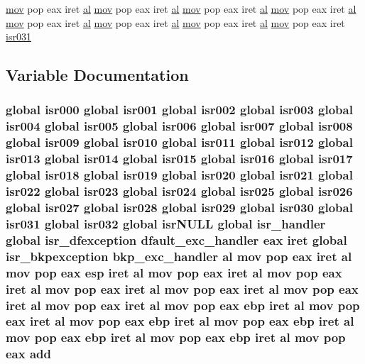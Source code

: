 \begin{DoxyCompactItemize}
\hyperlink{idt_8as_a3ca38a9ff3527e8845b56e9de4e66b0d}{mov} pop eax iret \hyperlink{isrs_8as_a55801884e6527c2d735351b4d6b66caf}{al} \hyperlink{idt_8as_a3ca38a9ff3527e8845b56e9de4e66b0d}{mov} pop eax iret \hyperlink{isrs_8as_a55801884e6527c2d735351b4d6b66caf}{al} \hyperlink{idt_8as_a3ca38a9ff3527e8845b56e9de4e66b0d}{mov} pop eax iret \hyperlink{isrs_8as_a55801884e6527c2d735351b4d6b66caf}{al} \hyperlink{idt_8as_a3ca38a9ff3527e8845b56e9de4e66b0d}{mov} pop eax iret \hyperlink{isrs_8as_a55801884e6527c2d735351b4d6b66caf}{al} \hyperlink{idt_8as_a3ca38a9ff3527e8845b56e9de4e66b0d}{mov} pop eax iret \hyperlink{isrs_8as_a55801884e6527c2d735351b4d6b66caf}{al} \hyperlink{idt_8as_a3ca38a9ff3527e8845b56e9de4e66b0d}{mov} pop eax iret \hyperlink{isrs_8as_a55801884e6527c2d735351b4d6b66caf}{al} \hyperlink{idt_8as_a3ca38a9ff3527e8845b56e9de4e66b0d}{mov} pop eax iret \hyperlink{isrs_8as_a55801884e6527c2d735351b4d6b66caf}{al} \hyperlink{idt_8as_a3ca38a9ff3527e8845b56e9de4e66b0d}{mov} pop eax iret \hyperlink{isrs_8as_aed11457273330a6f18970eca9c08d922}{isr031}
\end{DoxyCompactItemize}


\subsection{Variable Documentation}
\subsubsection[{\texorpdfstring{add}{add}}]{\setlength{\rightskip}{0pt plus 5cm}global {\bf isr000} global {\bf isr001} global {\bf isr002} global {\bf isr003} global {\bf isr004} global {\bf isr005} global {\bf isr006} global {\bf isr007} global {\bf isr008} global {\bf isr009} global {\bf isr010} global {\bf isr011} global {\bf isr012} global {\bf isr013} global {\bf isr014} global {\bf isr015} global {\bf isr016} global {\bf isr017} global {\bf isr018} global {\bf isr019} global {\bf isr020} global {\bf isr021} global {\bf isr022} global {\bf isr023} global {\bf isr024} global {\bf isr025} global {\bf isr026} global {\bf isr027} global {\bf isr028} global {\bf isr029} global {\bf isr030} global {\bf isr031} global isr032 global isr\+N\+U\+LL global isr\+\_\+handler global {\bf isr\+\_\+dfexception} {\bf dfault\+\_\+exc\+\_\+handler} eax iret global {\bf isr\+\_\+bkpexception} {\bf bkp\+\_\+exc\+\_\+handler} {\bf al} {\bf mov} pop eax iret {\bf al} {\bf mov} pop eax esp iret {\bf al} {\bf mov} pop eax iret {\bf al} {\bf mov} pop eax iret {\bf al} {\bf mov} pop eax iret {\bf al} {\bf mov} pop eax iret {\bf al} {\bf mov} pop eax iret {\bf al} {\bf mov} pop eax iret {\bf al} {\bf mov} pop eax ebp iret {\bf al} {\bf mov} pop eax iret {\bf al} {\bf mov} pop eax ebp iret {\bf al} {\bf mov} pop eax ebp iret {\bf al} {\bf mov} pop eax ebp iret {\bf al} {\bf mov} pop eax ebp iret {\bf al} {\bf mov} pop eax add}\hypertarget{isrs_8as_af39d6bbefcad5c6132537950a942ea57}{}\label{isrs_8as_af39d6bbefcad5c6132537950a942ea57}
